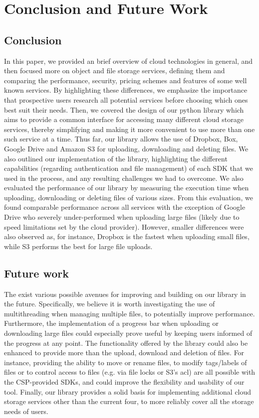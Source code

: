 \chapter{Conclusion and Future Work}

\section{Conclusion}
In this paper, we provided an brief overview of cloud technologies in general, and then focused more on object and file storage services, defining them and comparing the performance, security, pricing schemes and features of some well known services. By highlighting these differences, we emphasize the importance that prospective users research all potential services before choosing which ones best suit their needs. Then, we covered the design of our python library which aims to provide a common interface for accessing many different cloud storage services, thereby simplifying and making it more convenient to use more than one such service at a time. Thus far, our library allows the use of Dropbox, Box, Google Drive and Amazon S3 for uploading, downloading and deleting files. We also outlined our implementation of the library, highlighting the different capabilities (regarding authentication and file management) of each SDK that we used in the process, and any resulting challenges we had to overcome. We also evaluated the performance of our library by measuring the execution time when uploading, downloading or deleting files of various sizes. From this evaluation, we found comparable performance across all services with the exception of Google Drive who severely under-performed when uploading large files (likely due to speed limitations set by the cloud provider). However, smaller differences were also observed as, for instance, Dropbox is the fastest when uploading small files, while S3 performs the best for large file uploads.

\section{Future work}
The exist various possible avenues for improving and building on our library in the future. Specifically, we believe it is worth investigating the use of multithreading when managing multiple files, to potentially improve performance.  Furthermore, the implementation of a progress bar when uploading or downloading large files could especially prove useful by keeping users informed of the progress at any point. The functionality offered by the library  could also be enhanced to provide more than the upload, download and deletion of files. For instance, providing the ability to move or rename files, to modify tags/labels of files or to control access to files (e.g. via file locks or S3's \ac{acl}) are all possible with the CSP-provided SDKs, and could improve the flexibility and usability of our tool. Finally, our library provides a solid basis for implementing additional cloud storage services other than the current four, to more reliably cover all the storage needs of users. 